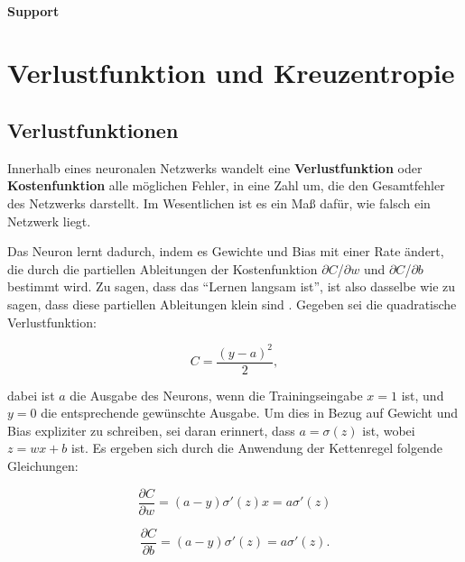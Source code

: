 \paragraph{Support}

        \section{Verlustfunktion und Kreuzentropie}
        \subsection{Verlustfunktionen}
        Innerhalb eines neuronalen Netzwerks wandelt eine \textbf{Verlustfunktion} oder \textbf{Kostenfunktion} alle möglichen Fehler, in eine Zahl um, die den Gesamtfehler des Netzwerks darstellt. Im Wesentlichen ist es ein Maß dafür, wie falsch ein Netzwerk liegt.

        Das Neuron lernt dadurch, indem es Gewichte und Bias mit einer Rate ändert, die durch die partiellen Ableitungen der Kostenfunktion $\partial$$C$/$\partial$$w$ und $\partial$$C$/$\partial$$b$ bestimmt wird. Zu sagen, dass das \enquote{Lernen langsam ist}, ist also dasselbe wie zu sagen, dass diese partiellen Ableitungen klein sind \cite*[61]{Nielsen2015}. Gegeben sei die quadratische Verlustfunktion:

        \begin{equation} \label{Formel2_5}
            C=\frac{( y-a)^{2}}{2},
        \end{equation}

        dabei ist $a$ die Ausgabe des Neurons, wenn die Trainingseingabe $x = 1$ ist, und $y = 0$ die entsprechende gewünschte Ausgabe. Um dies in Bezug auf Gewicht und Bias expliziter zu schreiben, sei daran erinnert, dass $a = \sigma(z)$ ist, wobei $z = wx + b$ ist. Es ergeben sich durch die Anwendung der Kettenregel folgende Gleichungen:

        \begin{equation} \label{Formel2_6}
            \frac{\partial C}{\partial w} =( a-y) \sigma '( z) x=a\sigma '( z)
        \end{equation}

        \begin{equation} \label{Formel2_7}
            \frac{\partial C}{\partial b} =( a-y) \sigma '( z) =a\sigma '( z).
        \end{equation}
        
